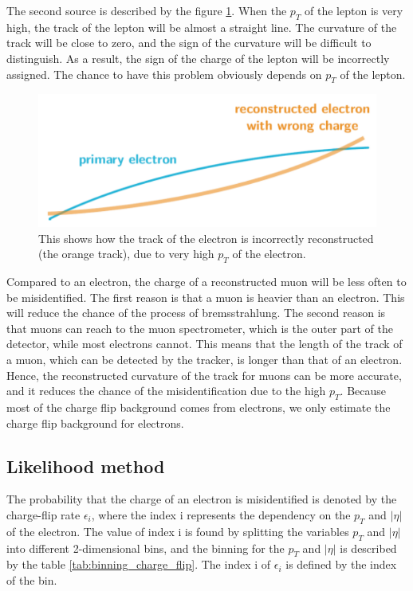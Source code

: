 The second source is described by the figure \ref{fig:charge_flip_high_pt}.
When the $p_T$ of the lepton is very high, the track of the lepton will be almost a straight line.
The curvature of the track will be close to zero, and the sign of the curvature will be difficult to distinguish.
As a result, the sign of the charge of the lepton will be incorrectly assigned.
The chance to have this problem obviously depends on $p_T$ of the lepton.

\begin{figure}
\centering
\includegraphics[width=\textwidth]{data/photo/charge_flip/WrongTrack.png}
\caption{This shows how the track of the electron is incorrectly reconstructed (the orange track), due to very high $p_T$ of the electron.}
\label{fig:charge_flip_high_pt}
\end{figure}

Compared to an electron, the charge of a reconstructed muon will be less often to be misidentified.
The first reason is that a muon is heavier than an electron.
This will reduce the chance of the process of bremsstrahlung.
The second reason is that muons can reach to the muon spectrometer, which is the outer part of the detector, while most electrons cannot.
This means that the length of the track of a muon, which can be detected by the tracker, is longer than that of an electron.
Hence, the reconstructed curvature of the track for muons can be more accurate, and it reduces the chance of the misidentification due to the high $p_T$.
Because most of the charge flip background comes from electrons, we only estimate the charge flip background for electrons.

\subsection{Likelihood method}
\label{sec:likelihood_method}
The probability that the charge of an electron is misidentified is denoted by the charge-flip rate $\epsilon_i$, where the index i represents the dependency on the $p_T$ and $|\eta|$ of the electron.
The value of index i is found by splitting the variables $p_T$ and $|\eta|$ into different 2-dimensional bins, and the binning for the $p_T$ and $|\eta|$ is described by the table \ref{tab:binning_charge_flip}. The index i of $\epsilon_i$ is defined by the index of the bin.

